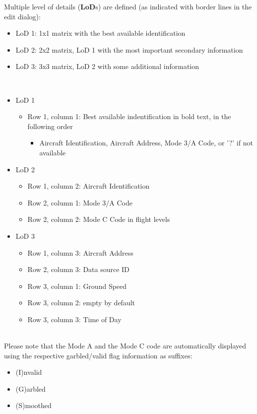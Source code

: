 Multiple level of details (\textbf{LoD}s) are defined (as indicated with border lines in the edit dialog):
\begin{itemize}
 \item LoD 1: 1x1 matrix with the best available identification
 \item LoD 2: 2x2 matrix, LoD 1 with the most important secondary information
 \item LoD 3: 3x3 matrix, LoD 2 with some additional information
\end{itemize} 
\ \\

\begin{itemize}
\item LoD 1
\begin{itemize}
 \item Row 1, column 1: Best available indentification in bold text, in the following order
 \begin{itemize}
 \item Aircraft Identification, Aircraft Address, Mode 3/A Code, or '?' if not available
 \end{itemize} 
 \end{itemize} 
\item LoD 2 
 \begin{itemize}
 \item Row 1, column 2: Aircraft Identification
 \item Row 2, column 1: Mode 3/A Code
 \item Row 2, column 2: Mode C Code in flight levels
 \end{itemize} 
\item LoD 3
 \begin{itemize}
 \item Row 1, column 3: Aircraft Address
 \item Row 2, column 3: Data source ID
 \item Row 3, column 1: Ground Speed
 \item Row 3, column 2: empty by default
 \item Row 3, column 3: Time of Day
 \end{itemize} 
\end{itemize} 
\ \\

Please note that the Mode A and the Mode C code are automatically displayed using the respective garbled/valid flag information as suffixes:

\begin{itemize}
 \item (I)nvalid
 \item (G)arbled
 \item (S)moothed
\end{itemize} 

